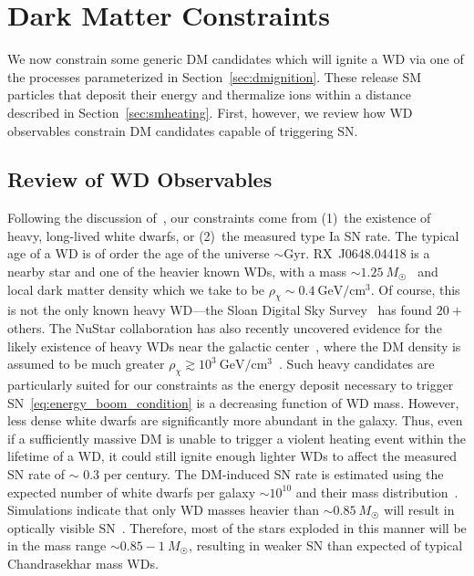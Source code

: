 \documentclass[preprintnumbers,amsmath,amssymb,prd,superscriptaddress]{revtex4}
\newcommand{\GeV}{\text{GeV}}
\begin{document}
\section{Dark Matter Constraints}
\label{sec:constraints}
We now constrain some generic DM candidates which will ignite a WD via one of the processes parameterized in Section~\ref{sec:dmignition}.
These release SM particles that deposit their energy and thermalize ions within a distance described in Section~\ref{sec:smheating}.
First, however, we review how WD observables constrain DM candidates capable of triggering SN.

\subsection{Review of WD Observables}
Following the discussion of~\cite{Graham:2015apa}, our constraints come from (1)~the existence of heavy, long-lived white dwarfs, or (2)~the measured type Ia SN rate.
The typical age of a WD is of order the age of the universe $\sim \text{Gyr}$.
RX~J0648.04418 is a nearby star and one of the heavier known WDs, with a mass $\sim 1.25 ~M_{\astrosun}$~\cite{Mereghetti:2013nba} and local dark matter density which we take to be $\rho_\chi \sim 0.4 ~\GeV/\text{cm}^3$.
Of course, this is not the only known heavy WD---the Sloan Digital Sky Survey~\cite{SDSS} has found $20+$ others.
The NuStar collaboration has also recently uncovered evidence for the likely existence of heavy WDs near the galactic center~\cite{NuStar}, where the DM density is assumed to be much greater $\rho_\chi \gtrsim 10^3 ~\text{GeV}/\text{cm}^3$~\cite{Nesti:2013uwa}.
Such heavy candidates are particularly suited for our constraints as the energy deposit necessary to trigger SN~\eqref{eq:energy_boom_condition} is a decreasing function of WD mass.
However, less dense white dwarfs are significantly more abundant in the galaxy.
Thus, even if a sufficiently massive DM is unable to trigger a violent heating event within the lifetime of a WD, it could still ignite enough lighter WDs to affect the measured SN rate of $\sim $ 0.3 per century.
The DM-induced SN rate is estimated using the expected number of white dwarfs per galaxy $\sim 10^{10}$ and their mass distribution~\cite{SDSS}.
Simulations indicate that only WD masses heavier than $\sim 0.85 ~M_{\astrosun}$ will result in optically visible SN~\cite{Graham:2015apa}.
Therefore, most of the stars exploded in this manner will be in the mass range $\sim 0.85 - 1 ~M_{\astrosun}$, resulting in weaker SN than expected of typical Chandrasekhar mass WDs.
\end{document}
